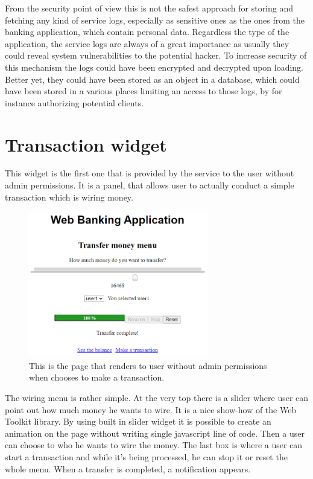 \documentclass[a4paper,12pt]{book}
\begin{document}
{{\bigskip
From the security point of view this is not the safest approach for storing and fetching any kind of service logs, especially as sensitive ones as the ones from the banking application, which contain personal data. Regardless the type of the application, the service logs are always of a great importance as usually they could reveal system vulnerabilities to the potential hacker. To increase security of this mechanism the logs could have been encrypted and decrypted upon loading. Better yet, they could have been stored as an object in a database, which could have been stored in a various places limiting an access to those logs, by for instance authorizing potential clients. 
}

\section*{Transaction widget}
{
This widget is the first one that is provided by the service to the user without admin permissions. It is a panel, that allows user to actually conduct a simple transaction which is wiring money.

\begin{figure}[H]
\centering
\includegraphics[width=0.7\textwidth]{wire}
\caption{This is the page that renders to user without admin permissions when chooses to make a transaction.}
\end{figure}

The wiring menu is rather simple. At the very top there is a slider where user can point out how much money he wants to wire. It is a nice show-how of the Web Toolkit library. By using built in slider widget it is possible to create an animation on the page without writing single javascript line of code. Then a user can choose to who he wants to wire the money. The last box is where a user can start a transaction and while it's being processed, he can stop it or reset the whole menu. When a transfer is completed, a notification appears.

}}
\end{document}
